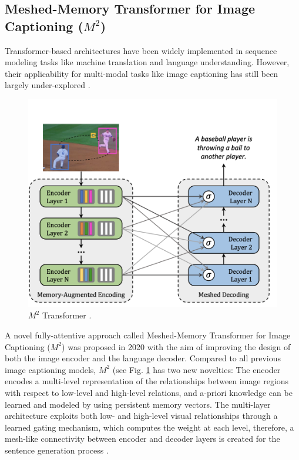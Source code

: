 \documentclass[
]{krantz}
\begin{document}
\hypertarget{meshed-memory-transformer-for-image-captioning-m2}{%
\subsection{\texorpdfstring{Meshed-Memory Transformer for Image Captioning (\(M^2\))}{Meshed-Memory Transformer for Image Captioning (M\^{}2)}}\label{meshed-memory-transformer-for-image-captioning-m2}}

Transformer-based architectures have been widely implemented in sequence modeling tasks like machine translation and language understanding. However, their applicability for multi-modal tasks like image captioning has still been largely under-explored \citep{cornia2020m2}.

\begin{figure}

{\centering \includegraphics[width=1\linewidth]{figures/02-01/2.2 m2arc1} 

}

\caption{\(M^2\) Transformer \citep{cornia2020m2}.}\label{fig:m2arc1}
\end{figure}



A novel fully-attentive approach called Meshed-Memory Transformer for Image Captioning (\(M^2\)) was proposed in 2020 \citep{cornia2020m2} with the aim of improving the design of both the image encoder and the language decoder. Compared to all previous image captioning models, \(M^2\) (see Fig. \ref{fig:m2arc1} has two new novelties: The encoder encodes a multi-level representation of the relationships between image regions with respect to low-level and high-level relations, and a-priori knowledge can be learned and modeled by using persistent memory vectors. The multi-layer architecture exploits both low- and high-level visual relationships through a learned gating mechanism, which computes the weight at each level, therefore, a mesh-like connectivity between encoder and decoder layers is created for the sentence generation process \citep{cornia2020m2}.
\end{document}
